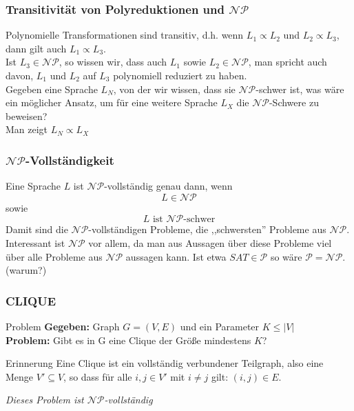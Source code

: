 \documentclass{beamer}
\begin{document}
{%
\begin{frame}
\frametitle{Transitivität von Polyreduktionen und $\mathcal{NP}$}
Polynomielle Transformationen sind transitiv, d.h. wenn $L_1 \propto L_2$ und $L_2 \propto L_3$, dann gilt auch $L_1 \propto L_3$.\\[8pt]
Ist $L_3 \in \mathcal{NP}$, so wissen wir, dass auch $L_1$ sowie $L_2 \in \mathcal{NP}$, man spricht auch davon, $L_1$ und $L_2$ auf $L_3$ polynomiell reduziert zu haben.\\[8pt]
Gegeben eine Sprache $L_N$, von der wir wissen, dass sie $\mathcal{NP}$-schwer ist, was wäre ein möglicher Ansatz, um für eine weitere Sprache $L_X$ die $\mathcal{NP}$-Schwere zu beweisen?\\
\pause
Man zeigt $L_N \propto L_X$
\end{frame}

\begin{frame}
\frametitle{$\mathcal{NP}$-Vollständigkeit}
Eine Sprache $L$ ist $\mathcal{NP}$-vollständig genau dann, wenn
$$L \in \mathcal{NP}$$ sowie $$L\mbox{ ist $\mathcal{NP}$-schwer}$$
Damit sind die $\mathcal{NP}$-vollständigen Probleme, die ,,schwersten'' Probleme aus $\mathcal{NP}$.\\
Interessant ist $\mathcal{NP}$ vor allem, da man aus Aussagen über diese Probleme viel über alle Probleme aus $\mathcal{NP}$ aussagen kann.
Ist etwa $SAT \in \mathcal{P}$ so wäre $\mathcal{P} = \mathcal{NP}$. (warum?)
\end{frame}

\begin{frame}
\frametitle{CLIQUE}
\begin{block}{Problem}
\textbf{Gegeben:} Graph $G = (V, E)$ und ein Parameter $K \leq |V|$\\
\textbf{Problem:} Gibt es in G eine Clique der Größe mindestens $K$?
\end{block}
\begin{block}{Erinnerung}
Eine Clique ist ein vollständig verbundener Teilgraph, also eine Menge $V' \subseteq V$, so dass für alle $i,j \in V'$ mit $i\neq j$ gilt: $(i, j) \in E$.
\end{block}
\textit{Dieses Problem ist $\mathcal{NP}$-vollständig}
\end{frame}

}
\end{document}
